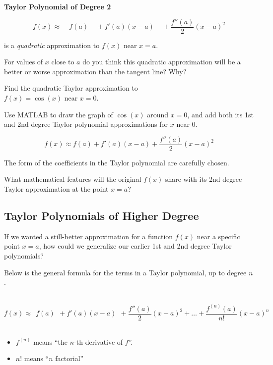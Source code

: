 \vfill

\newpage

\begin{boxnote}

{\bf Taylor Polynomial of Degree 2}
\vspace{1in}

$$ f(x) \approx ~~~~~f(a) ~~~~~+ f'(a) (x-a) ~~~~~+ \frac{f''(a)}{2} (x-a)^2$$  

\vspace{1in}

is a {\em quadratic} approximation to $f(x)$ near $x=a$.
\end{boxnote}


\problem For values of $x$ close to $a$ do you think this quadratic
approximation will be a better or worse approximation than the tangent
line?  Why?

\vfill

\newpage

\problem Find the quadratic Taylor approximation to \\$f(x) = \cos(x)$
  near $x=0$.

\vfill

\newpage

\problem Use MATLAB to draw the graph of $\cos(x)$ around $x=0$, and
add both its 1st and 2nd degree Taylor polynomial approximations for
$x$ near 0.


\newpage
$$ f(x) \approx f(a) + f'(a) (x-a) + \frac{f''(a)}{2} (x-a)^2$$  

The form of the coefficients in the Taylor polynomial are carefully
chosen.

\problem What mathematical features will the original $f(x)$ share
with its 2nd degree Taylor approximation at the point $x=a$?

\vfill

\newpage
{}
\subsection{Taylor Polynomials of Higher Degree}

\problem If we wanted a still-better approximation for a function
$f(x)$ near a specific point $x=a$, how could we generalize our
earlier 1st and 2nd degree Taylor polynomials?

\vfill

\newpage 

Below is the general formula for the terms in a Taylor polynomial, up
to degree $n$.  \\
\begin{boxnote} ~\\[1ex]
$$ f(x) \approx ~~f(a) ~~+ f'(a) (x-a) ~~+ \frac{f''(a)}{2} (x-a)^2 + \ldots 
+ \frac{f^{(n)}(a)}{n!} (x-a)^n$$    \\[-0.5ex]
\end{boxnote}
\begin{itemize}
\item $f^{(n)}$ means ``the $n$-th derivative of $f$''. \\
\item $n!$ means ``$n$ factorial''
\end{itemize}

